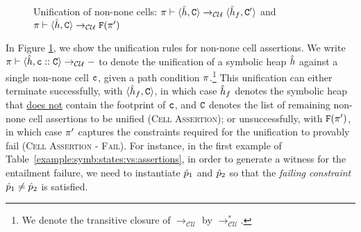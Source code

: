 \begin{figure}[!t]
{\scriptsize
{}}
\vspace*{-0.5cm}
\caption{Unification of non-none cells: $\pi \vdash \langle \hat{h}, \mathtt{C} \rangle \rightarrow_{\mathcal{CU}} \langle \hat{h}_f, \mathtt{C}' \rangle$
and $\pi \vdash \langle \hat{h}, \mathtt{C} \rangle \rightarrow_{\mathcal{CU}} {\mathtt{F}}(\pi')$}
\label{fig:uninonnone}
\vspace*{-0.2cm}
\end{figure}


In Figure \ref{fig:uninonnone}, we show the unification rules for non-none cell assertions. 
We write $\pi \vdash \langle \hat{h}, \mathtt{c} :: \mathtt{C} \rangle \rightarrow_{\mathcal{CU}} -$ to denote the unification of a symbolic heap $\hat{h}$ against a single non-none cell $\mathtt{c}$, given a path condition $\pi$.\footnote{We denote the transitive closure of $\rightarrow_{\mathcal{CU}}$ by $\rightarrow_{\mathcal{CU}}^*$.}  This unification can either terminate
successfully, with $\langle \hat{h}_f, \mathtt{C} \rangle$, in which case $\hat{h}_f$ denotes the
symbolic heap %
that \underline{does not} contain the footprint of $\mathtt{c}$, 
 and $\mathtt{C}$ denotes the list of remaining non-none cell assertions to be unified (\textsc{Cell Assertion}); or unsuccessfully, with ${\mathtt{F}}(\pi')$, 
in which case $\pi'$ captures the constraints required for the unification to provably fail (\textsc{Cell Assertion - Fail}).
For instance, in the first example of Table~\ref{example:symb:states:vs:assertions}, 
in order to generate a witness for the entailment failure, we need to instantiate $\hat{p}_1$ and $\hat{p}_2$ so that the \emph{failing constraint} $\hat{p}_1 \neq \hat{p}_2$ is satisfied. 

